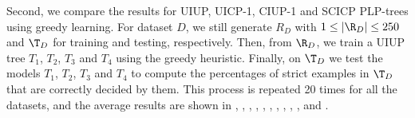 Second, we compare the results for UIUP, UICP-1, CIUP-1 and SCICP
PLP-trees using greedy learning.
For dataset $D$, we still generate $R_D$ with $1 \leq |\R_D| \leq 250$ 
and $\T_D$ for training and testing, respectively.
Then, from $\R_D$, we train a UIUP tree $T_1$, $T_2$, $T_3$ and $T_4$ using
the greedy heuristic.
Finally, on $\T_D$ we test the models $T_1$, $T_2$, $T_3$ and $T_4$ to compute the percentages of 
strict examples in $\T_D$ that are correctly decided by them.
This process is repeated 20 times for all the datasets, and the average results are
shown in , , , , ,
, , , , , and .


\begin{figure}[ht]
	\centering


\end{figure}
